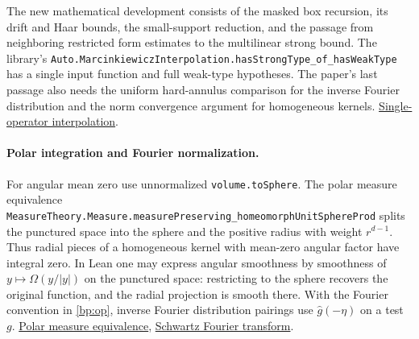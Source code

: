 \documentclass[11pt,letterpaper]{article}
\theoremstyle{definition}
\begin{document}
The new mathematical development consists of the masked box recursion, its drift and Haar bounds, the small-support reduction, and the passage from neighboring restricted form estimates to the multilinear strong bound. The library's \nolinkurl{Auto.MarcinkiewiczInterpolation.hasStrongType_of_hasWeakType} has a single input function and full weak-type hypotheses. The paper's last passage also needs the uniform hard-annulus comparison for the inverse Fourier distribution and the norm convergence argument for homogeneous kernels. \href{https://github.com/roos-j/lean-spherical/blob/800b71afca91e42809c21e6e2fd9ae4f82467082/LeanSpherical/Auto/MarcinkiewiczInterpolation.lean#L3160}{Single-operator interpolation}.
\par\paragraph{Polar integration and Fourier normalization.}
For angular mean zero use unnormalized \nolinkurl{volume.toSphere}.
The polar measure equivalence
\nolinkurl{MeasureTheory.Measure.measurePreserving_homeomorphUnitSphereProd}
splits the punctured space into the sphere and the positive radius
with weight \(r^{d-1}\). Thus radial pieces of a homogeneous kernel
with mean-zero angular factor have integral zero. In Lean one may
express angular smoothness by smoothness of
\(y\mapsto\Omega(y/|y|)\) on the punctured space: restricting to the
sphere recovers the original function, and the radial projection is
smooth there. With the Fourier convention in \eqref{bp:op}, inverse
Fourier distribution pairings use \(\widehat g(-\eta)\) on a test \(g\).
\href{https://github.com/leanprover-community/mathlib4/blob/c55e6e786f49471c72fbddbec5415808896aec1e/Mathlib/MeasureTheory/Constructions/HaarToSphere.lean}{Polar measure equivalence},
\href{https://github.com/leanprover-community/mathlib4/blob/c55e6e786f49471c72fbddbec5415808896aec1e/Mathlib/Analysis/Distribution/SchwartzSpace/Fourier.lean}{Schwartz Fourier transform}.

\endgroup
\end{document}

